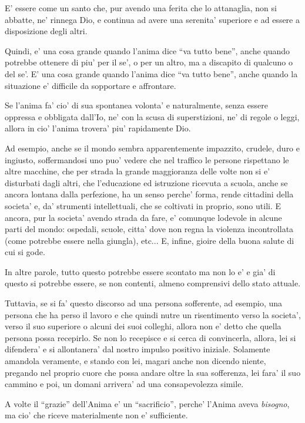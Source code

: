 E' essere come un santo che, pur avendo una ferita che lo attanaglia, non si abbatte, ne' rinnega Dio, e continua ad avere una serenita' superiore e ad essere a disposizione degli altri.

Quindi, e' una cosa grande quando l'anima dice ``va tutto bene'', anche quando potrebbe ottenere di piu' per il se', o per un altro, ma a discapito di qualcuno o del se'. E' una cosa grande quando l'anima dice ``va tutto bene'', anche quando la situazione e' difficile da sopportare e affrontare.

Se l'anima fa' cio' di sua spontanea volonta' e naturalmente, senza essere oppressa e obbligata dall'Io, ne' con la scusa di superstizioni, ne' di regole o leggi, allora in cio' l'anima trovera' piu' rapidamente Dio.

Ad esempio, anche se il mondo sembra apparentemente impazzito, crudele, duro e ingiusto, soffermandosi uno puo' vedere che nel traffico le persone rispettano le altre macchine, che per strada la grande maggioranza delle volte non si e' disturbati dagli altri, che l'educazione ed istruzione ricevuta a scuola, anche se ancora lontana dalla perfezione, ha un senso perche' forma, rende cittadini della societa' e, da' strumenti intellettuali, che se coltivati in proprio, sono utili. E ancora, pur la societa' avendo strada da fare, e' comunque lodevole in alcune parti del mondo: ospedali, scuole, citta' dove non regna la violenza incontrollata (come potrebbe essere nella giungla), etc... E, infine, gioire della buona salute di cui si gode.

In altre parole, tutto questo potrebbe essere scontato ma non lo e' e gia' di questo si potrebbe essere, se non contenti, almeno comprensivi dello stato attuale.

Tuttavia, se si fa' questo discorso ad una persona sofferente, ad esempio, una persona che ha perso il lavoro e che quindi nutre un risentimento verso la societa', verso il suo superiore o alcuni dei suoi colleghi, allora non e' detto che quella persona possa recepirlo. Se non lo recepisce e si cerca di convincerla, allora, lei si difendera' e si allontanera' dal nostro impulso positivo iniziale. Solamente amandola veramente, e stando con lei, magari anche non dicendo niente, pregando nel proprio cuore che possa andare oltre la sua sofferenza, lei fara' il suo cammino e poi, un domani arrivera' ad una consapevolezza simile.

A volte il ``grazie'' dell'Anima e' un ``sacrificio'', perche' l'Anima aveva \emph{bisogno}, ma cio' che riceve materialmente non e' sufficiente.

